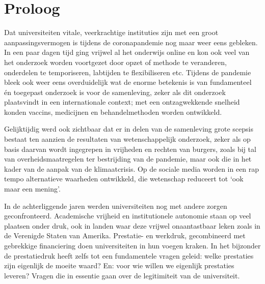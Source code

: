 \documentclass{jote-book}
\begin{document}
	\chapter{Proloog}































	Dat universiteiten vitale, veerkrachtige instituties zijn met een groot aanpassingsvermogen is tijdens de coronapandemie nog maar weer eens gebleken. In een paar dagen tijd ging vrijwel al het onderwijs online en kon ook veel van het onderzoek worden voortgezet door opzet of methode te veranderen, onderdelen te temporiseren, labtijden te flexibiliseren etc. Tijdens de pandemie bleek ook weer eens overduidelijk wat de enorme betekenis is van fundamenteel én toegepast onderzoek is voor de samenleving, zeker als dit onderzoek plaatsvindt in een internationale context; met een ontzagwekkende snelheid konden vaccins, medicijnen en behandelmethoden worden ontwikkeld.



	Gelijktijdig werd ook zichtbaar dat er in delen van de samenleving grote scepsis bestaat ten aanzien de resultaten van wetenschappelijk onderzoek, zeker als op basis daarvan wordt ingegrepen in vrijheden en rechten van burgers, zoals bij tal van overheidsmaatregelen ter bestrijding van de pandemie, maar ook die in het kader van de aanpak van de klimaatcrisis. Op de sociale media worden in een rap tempo alternatieve waarheden ontwikkeld, die wetenschap reduceert tot ‘ook maar een mening'.



	In de achterliggende jaren werden universiteiten nog met andere zorgen geconfronteerd. Academische vrijheid en institutionele autonomie staan op veel plaatsen onder druk, ook in landen waar deze vrijwel onaantastbaar leken zoals in de Verenigde Staten van Amerika. Prestatie- en werkdruk, gecombineerd met gebrekkige financiering doen universiteiten in hun voegen kraken. In het bijzonder de prestatiedruk heeft zelfs tot een fundamentele vragen geleid: welke prestaties zijn eigenlijk de moeite waard? En: voor wie willen we eigenlijk prestaties leveren? Vragen die in essentie gaan over de legitimiteit van de universiteit.
\end{document}
